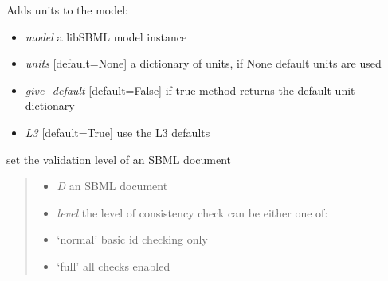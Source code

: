 \documentclass[a4paper,11pt,english]{sphinxmanual}
\begin{document}
\begin{fulllineitems}
\label{modules_doc:cbmpy.CBXML.sbml_setUnits}
Adds units to the model:
\begin{itemize}
\item {} 
\emph{model} a libSBML model instance

\item {} 
\emph{units} {[}default=None{]} a dictionary of units, if None default units are used

\item {} 
\emph{give\_default} {[}default=False{]} if true method returns the default unit dictionary

\item {} 
\emph{L3} {[}default=True{]} use the L3 defaults

\end{itemize}

\end{fulllineitems}


\begin{fulllineitems}
\label{modules_doc:cbmpy.CBXML.sbml_setValidationOptions}
set the validation level of an SBML document
\begin{quote}
\begin{itemize}
\item {} 
\emph{D} an SBML document

\item {} 
\emph{level} the level of consistency check can be either one of:

\end{itemize}
\begin{itemize}
\item {} 
`normal' basic id checking only

\item {} 
`full' all checks enabled

\end{itemize}
\end{quote}

\end{fulllineitems}

\end{document}
